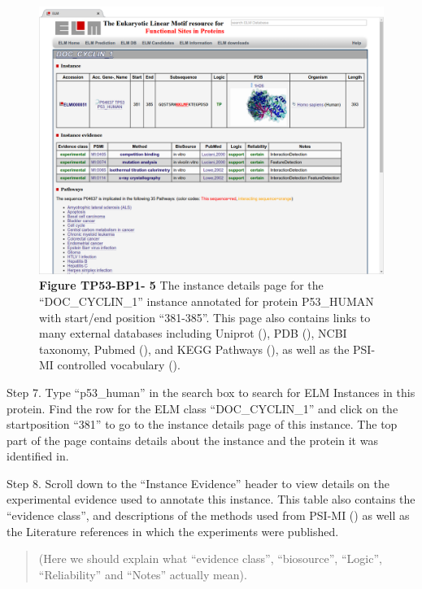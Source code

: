 \begin{figure}[h!]
\centering
\includegraphics[width=\textwidth]{Figures/TP53_1/doc_cyclin_1_instance.png}
\caption{
\textbf{Figure TP53-BP1- 5} The instance details page for the
``DOC\_CYCLIN\_1'' instance annotated for protein P53\_HUMAN with
start/end position ``381-385''. This page also contains links to many
external databases including Uniprot (\cite{25348405}), PDB
(\cite{12037327}), NCBI taxonomy, Pubmed (\cite{27899561}), and KEGG
Pathways (\cite{26476454}), as well as the PSI-MI controlled vocabulary
(\cite{17925023}).
}
\end{figure}

Step 7. Type ``p53\_human'' in the search box to search for ELM
Instances in this protein. Find the row for the ELM class
``DOC\_CYCLIN\_1'' and click on the startposition ``381'' to go to the
instance details page of this instance. The top part of the page
contains details about the instance and the protein it was identified
in.

Step 8. Scroll down to the ``Instance Evidence'' header to view details
on the experimental evidence used to annotate this instance. This table
also contains the ``evidence class'', and descriptions of the methods
used from PSI-MI (\cite{17925023}) as well as the Literature references
in which the experiments were published.

\begin{quote}
(Here we should explain what ``evidence class'', ``biosource'',
``Logic'', ``Reliability'' and ``Notes'' actually mean).
\end{quote}

